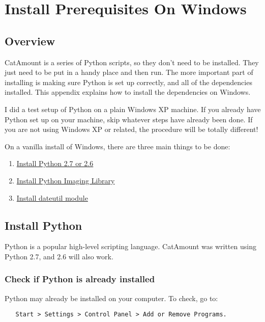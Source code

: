 \chapter{Install Prerequisites On Windows}
\hypertarget{prereq-windows}{}

\section{Overview}

CatAmount is a series of Python scripts, so they don't need to be
installed. They just need to be put in a handy place and then run.
The more important part of installing is making sure Python is
set up correctly, and all of the dependencies installed. This
appendix explains how to install the dependencies on Windows.

I did a test setup of Python on a plain Windows XP machine. If
you already have Python set up on your machine, skip whatever steps
have already been done. If you are not using Windows XP or
related, the procedure will be totally different!

On a vanilla install of Windows, there are three main things to
be done:

\begin{enumerate}
\item \hyperlink{prereq-windows-python}{Install Python 2.7 or 2.6}
\item \hyperlink{prereq-windows-pil}{Install Python Imaging Library}
\item \hyperlink{prereq-windows-dateutil}{Install dateutil module}
\end{enumerate}


\section{Install Python}
\hypertarget{prereq-windows-python}{}

Python is a popular high-level scripting language. CatAmount was
written using Python 2.7, and 2.6 will also work.

\subsection{Check if Python is already installed}

Python may already be installed on your computer. To check, go
to:

\begin{verbatim}
   Start > Settings > Control Panel > Add or Remove Programs.
\end{verbatim}

